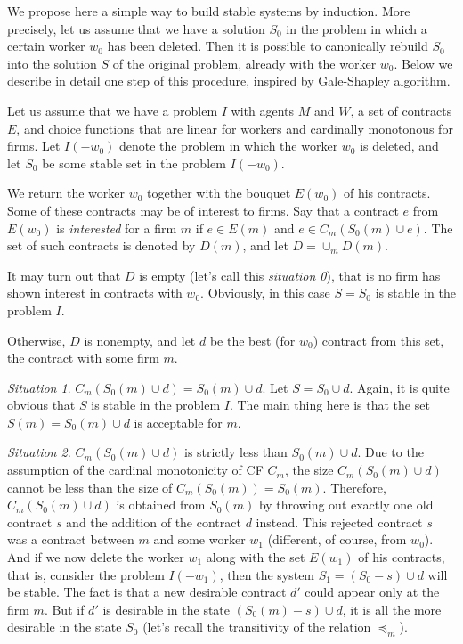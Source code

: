 \documentclass[12pt,a4paper]{article}
\begin{document}
We propose here a simple way to build stable systems by induction. More precisely, let us assume that we have a solution $S_0$ in the problem in which a certain worker $w_0$ has been deleted. Then it is possible to canonically rebuild $S_0$ into the solution $S$ of the original problem, already with the worker $w_0$. Below we describe in detail one step of this procedure, inspired by Gale-Shapley algorithm.

Let us assume that we have a problem $I$ with agents $M$ and $W$, a set of
contracts $E$, and choice functions that are linear for workers and cardinally monotonous for firms. Let $I(-w_0)$ denote the problem in which the worker $w_0$ is deleted, and let $S_0$ be some stable set in the problem $I(-w_0)$.

We return the worker $w_0$ together with the bouquet $E(w_0)$ of his contracts. Some of these contracts may be of interest to firms. Say that a contract $e$ from $E(w_0)$ is \emph{interested} for a firm $m$ if $e\in E(m)$ and $e\in C_m(S_0(m)\cup e)$. The set of such contracts is denoted by $D(m)$, and let $D=\cup _m D(m)$.

It may turn out that $D$ is empty (let's call this \emph{situation 0}), that is no firm has shown interest in contracts with $w_0$. Obviously, in this case $S=S_0$ is stable in the  problem $I$.

Otherwise, $D$ is nonempty, and let $d$ be the best (for $w_0$) contract from this set, the contract with some firm $m$.

\emph{Situation 1}. $C_m(S_0(m)\cup d)=S_0(m)\cup d$. Let $S=S_0\cup d$. Again, it is quite obvious that $S$ is stable in the problem $I$. The main thing here is that the set $S(m)=S_0(m)\cup d$ is acceptable for $m$.

\emph{Situation 2.} $C_m(S_0(m)\cup d)$ is strictly less than $S_0(m)\cup d$. Due to the assumption of the cardinal monotonicity of CF $C_m$, the size
$C_m(S_0(m)\cup d)$ cannot be less than the size of $C_m(S_0(m))=S_0(m)$.
Therefore, $C_m(S_0(m)\cup d)$ is obtained from $S_0(m)$ by throwing out exactly one old contract $s$ and the addition of the contract $d$ instead. This rejected contract $s$ was a contract between $m$ and some worker $w_1$ (different, of course, from $w_0$). And if we now delete the worker $w_1$ along with the set $E(w_1)$ of his contracts, that is, consider the problem $I(-w_1)$, then the system $S_1=(S_0-s)\cup d$ will be stable. The fact is that a new desirable contract $d'$ could appear only at the firm $m$. But if $d'$ is desirable in the state $(S_0(m)-s)\cup d$, it is all the more desirable in the state $S_0$ (let's recall the transitivity of the relation $\preceq _m$).\medskip
\end{document}

